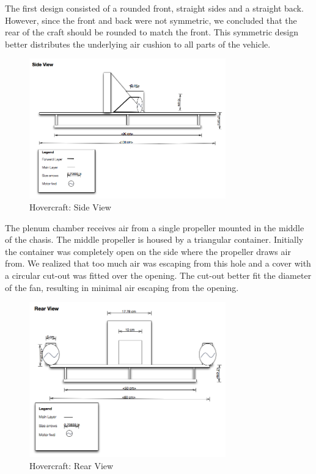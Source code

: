 The first design consisted of a rounded front, straight sides and a straight back. However, since the front and back were not symmetric, we concluded that the rear of the craft should be rounded to match the front. This symmetric design better distributes the underlying air cushion to all parts of the vehicle.

\begin{figure}[h]
  \begin{center}
    \includegraphics[width=85mm]{imageSources/sideView.png}
  \end{center}
  \caption{Hovercraft: Side View} 
  \label{sideView}
\end{figure}

The plenum chamber receives air from a single propeller mounted in the middle of the chasis. The middle propeller is housed by a triangular container. Initially the container was completely open on the side where the propeller draws air from. We realized that too much air was escaping from this hole and a cover with a circular cut-out was fitted over the opening. The cut-out better fit the diameter of the fan, resulting in minimal air escaping from the opening.

\begin{figure}[h]
  \begin{center}
    \includegraphics[width=85mm]{imageSources/rearView.png}
  \end{center}
  \caption{Hovercraft: Rear View} 
  \label{rearView}
\end{figure}

